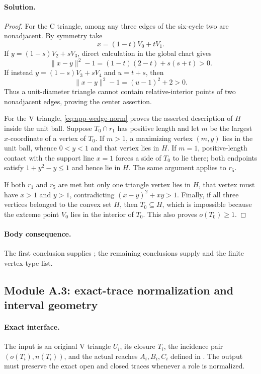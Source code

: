 \paragraph{Solution.}

\begin{proof}
For the C triangle, among any three edges of the six-cycle two are
nonadjacent.  By symmetry take
\[
 x=(1-t)V_0+tV_1.
\]
If $y=(1-s)V_2+sV_3$, direct calculation in the global chart gives
\[
 \lVert x-y\rVert^2-1=(1-t)(2-t)+s(s+t)>0.
\]
If instead $y=(1-s)V_3+sV_4$ and $u=t+s$, then
\[
 \lVert x-y\rVert^2-1=(u-1)^2+2>0.
\]
Thus a unit-diameter triangle cannot contain relative-interior points of two
nonadjacent edges, proving the center assertion.

For the V triangle, \eqref{eq:app-wedge-norm} proves the asserted description
of $H$ inside the unit ball.  Suppose $T_0\cap r_1$ has positive length and
let $m$ be the largest $x$-coordinate of a vertex of $T_0$.  If $m>1$, a
maximizing vertex $(m,y)$ lies in the unit ball, whence $0<y<1$ and that
vertex lies in $H$.  If $m=1$, positive-length contact with the support line
$x=1$ forces a side of $T_0$ to lie there; both endpoints satisfy
$1+y^2-y\le1$ and hence lie in $H$.  The same argument applies to $r_5$.

If both $r_1$ and $r_5$ are met but only one triangle vertex lies in $H$,
that vertex must have $x>1$ and $y>1$, contradicting
$(x-y)^2+xy>1$.  Finally, if all three vertices belonged to the convex set
$H$, then $T_0\subseteq H$, which is impossible because the extreme point
$V_0$ lies in the interior of $T_0$.  This also proves $o(T_0)\ge1$.
\end{proof}

\paragraph{Body consequence.}
The first conclusion supplies ; the remaining
conclusions supply  and the finite vertex-type list.

\subsection{Module A.3: exact-trace normalization and interval geometry}

\paragraph{Exact interface.}
The input is an original V triangle $U_i$, its closure $T_i$, the incidence
pair $(o(T_i),n(T_i))$, and the actual reaches $A_i,B_i,C_i$ defined in
.  The output must preserve the exact open and closed
traces whenever a role is normalized.

